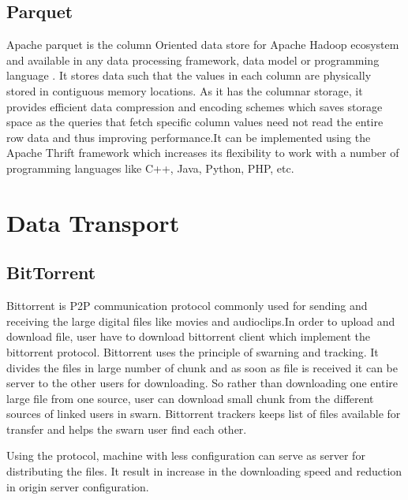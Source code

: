      
\subsection{ Parquet}

     Apache parquet is the column Oriented data store for Apache
     Hadoop ecosystem and available in any data processing framework,
     data model or programming language \cite{www-parquet}. It
     stores data such that the values in each column are physically
     stored in contiguous memory locations. As it has the columnar
     storage, it provides efficient data compression and encoding
     schemes which saves storage space as the queries that fetch
     specific column values need not read the entire row data and thus
     improving performance.It can be implemented using the Apache
     Thrift framework which increases its flexibility to work with a
     number of programming languages like C++, Java, Python, PHP, etc.
     
\section{Data Transport}

\subsection{ BitTorrent}

     Bittorrent is P2P communication protocol commonly used for
     sending and receiving the large digital files like movies and
     audioclips.In order to upload and download file, user have to
     download bittorrent client which implement the bittorrent
     protocol. Bittorrent uses the principle of swarning and
     tracking. \cite{www-bittorrent} It divides the files in large
     number of chunk and as soon as file is received it can be server
     to the other users for downloading.  So rather than downloading
     one entire large file from one source, user can download small
     chunk from the different sources of linked users in
     swarn. Bittorrent trackers keeps list of files available for
     transfer and helps the swarn user find each other.

     Using the protocol, machine with less configuration can serve as
     server for distributing the files. It result in increase in the
     downloading speed and reduction in origin server configuration.

